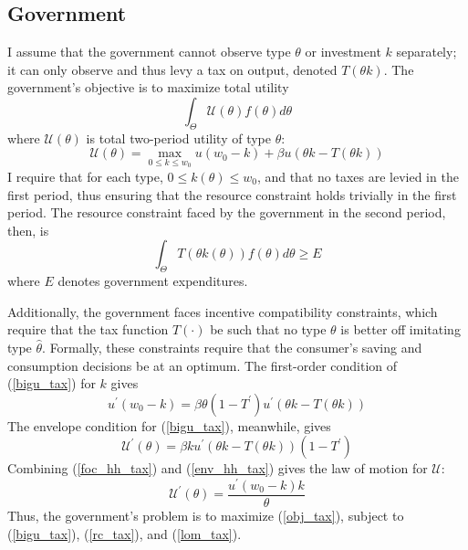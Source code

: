 \documentclass[11pt]{article}
\newcommand{\p}{\prime}
\newcommand{\U}{\mathcal{U}}
\begin{document}
\subsection{Government}
I assume that the government cannot observe type \( \theta \) or investment \( k \) separately; it can only observe and thus levy a tax on output, denoted \( T(\theta k) \). The government's objective is to maximize total utility
\begin{equation}
    \int_\Theta \U(\theta)f(\theta)d\theta \label{obj_tax}
\end{equation}
where \( \U(\theta) \) is total two-period utility of type \( \theta \):
\begin{equation}
    \U(\theta) = \max_{0\leq k \leq w_0} u(w_0 - k) + \beta u(\theta k - T(\theta k)) \label{bigu_tax}
\end{equation}
I require that for each type, \( 0 \leq k(\theta) \leq w_0 \), and that no taxes are levied in the first period, thus ensuring that the resource constraint holds trivially in the first period. The resource constraint faced by the government in the second period, then, is 
\begin{equation}
    \int_\Theta T(\theta k(\theta))f(\theta)d\theta \geq E \label{rc_tax}
\end{equation}
where \( E \) denotes government expenditures. 

Additionally, the government faces incentive compatibility constraints, which require that the tax function \( T(\cdot) \) be such that no type \( \theta \) is better off imitating type \( \hat{\theta} \). Formally, these constraints require that the consumer's saving and consumption decisions be at an optimum. The first-order condition of (\ref{bigu_tax}) for \( k \) gives
\begin{equation}
    u^\p(w_0 - k) = \beta \theta (1 - T^\p)u^\p (\theta k - T(\theta k)) \label{foc_hh_tax}
\end{equation}
The envelope condition for (\ref{bigu_tax}), meanwhile, gives 
\begin{equation}
    \U^\p(\theta) = \beta k u^\p (\theta k - T(\theta k)) (1 - T^\p) \label{env_hh_tax}
\end{equation}
Combining (\ref{foc_hh_tax}) and (\ref{env_hh_tax}) gives the law of motion for \( \U \):
\begin{equation}
    \U^\p(\theta) = \frac{u^\p(w_0 - k)k}{\theta} \label{lom_tax}
\end{equation}
Thus, the government's problem is to maximize (\ref{obj_tax}), subject to (\ref{bigu_tax}), (\ref{rc_tax}), and (\ref{lom_tax}). 
\end{document}
